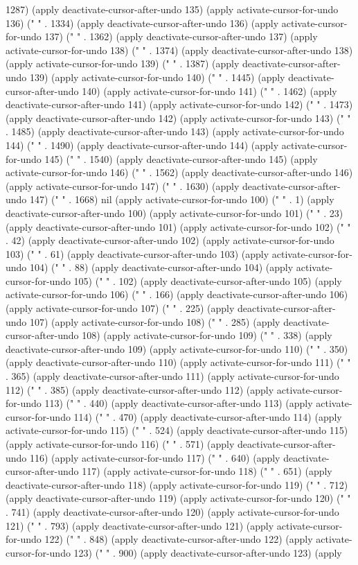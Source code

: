 1287) (apply deactivate-cursor-after-undo 135) (apply activate-cursor-for-undo 136) (" " . 1334) (apply deactivate-cursor-after-undo 136) (apply activate-cursor-for-undo 137) (" " . 1362) (apply deactivate-cursor-after-undo 137) (apply activate-cursor-for-undo 138) (" " . 1374) (apply deactivate-cursor-after-undo 138) (apply activate-cursor-for-undo 139) (" " . 1387) (apply deactivate-cursor-after-undo 139) (apply activate-cursor-for-undo 140) (" " . 1445) (apply deactivate-cursor-after-undo 140) (apply activate-cursor-for-undo 141) (" " . 1462) (apply deactivate-cursor-after-undo 141) (apply activate-cursor-for-undo 142) (" " . 1473) (apply deactivate-cursor-after-undo 142) (apply activate-cursor-for-undo 143) (" " . 1485) (apply deactivate-cursor-after-undo 143) (apply activate-cursor-for-undo 144) (" " . 1490) (apply deactivate-cursor-after-undo 144) (apply activate-cursor-for-undo 145) (" " . 1540) (apply deactivate-cursor-after-undo 145) (apply activate-cursor-for-undo 146) (" " . 1562) (apply deactivate-cursor-after-undo 146) (apply activate-cursor-for-undo 147) (" " . 1630) (apply deactivate-cursor-after-undo 147) (" " . 1668) nil (apply activate-cursor-for-undo 100) (" " . 1) (apply deactivate-cursor-after-undo 100) (apply activate-cursor-for-undo 101) (" " . 23) (apply deactivate-cursor-after-undo 101) (apply activate-cursor-for-undo 102) (" " . 42) (apply deactivate-cursor-after-undo 102) (apply activate-cursor-for-undo 103) (" " . 61) (apply deactivate-cursor-after-undo 103) (apply activate-cursor-for-undo 104) (" " . 88) (apply deactivate-cursor-after-undo 104) (apply activate-cursor-for-undo 105) (" " . 102) (apply deactivate-cursor-after-undo 105) (apply activate-cursor-for-undo 106) (" " . 166) (apply deactivate-cursor-after-undo 106) (apply activate-cursor-for-undo 107) (" " . 225) (apply deactivate-cursor-after-undo 107) (apply activate-cursor-for-undo 108) (" " . 285) (apply deactivate-cursor-after-undo 108) (apply activate-cursor-for-undo 109) (" " . 338) (apply deactivate-cursor-after-undo 109) (apply activate-cursor-for-undo 110) (" " . 350) (apply deactivate-cursor-after-undo 110) (apply activate-cursor-for-undo 111) (" " . 365) (apply deactivate-cursor-after-undo 111) (apply activate-cursor-for-undo 112) (" " . 385) (apply deactivate-cursor-after-undo 112) (apply activate-cursor-for-undo 113) (" " . 440) (apply deactivate-cursor-after-undo 113) (apply activate-cursor-for-undo 114) (" " . 470) (apply deactivate-cursor-after-undo 114) (apply activate-cursor-for-undo 115) (" " . 524) (apply deactivate-cursor-after-undo 115) (apply activate-cursor-for-undo 116) (" " . 571) (apply deactivate-cursor-after-undo 116) (apply activate-cursor-for-undo 117) (" " . 640) (apply deactivate-cursor-after-undo 117) (apply activate-cursor-for-undo 118) (" " . 651) (apply deactivate-cursor-after-undo 118) (apply activate-cursor-for-undo 119) (" " . 712) (apply deactivate-cursor-after-undo 119) (apply activate-cursor-for-undo 120) (" " . 741) (apply deactivate-cursor-after-undo 120) (apply activate-cursor-for-undo 121) (" " . 793) (apply deactivate-cursor-after-undo 121) (apply activate-cursor-for-undo 122) (" " . 848) (apply deactivate-cursor-after-undo 122) (apply activate-cursor-for-undo 123) (" " . 900) (apply deactivate-cursor-after-undo 123) (apply 